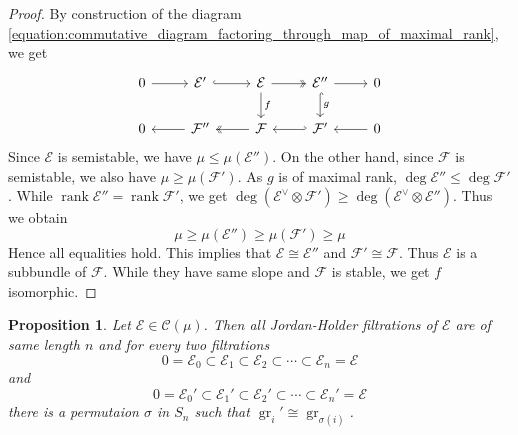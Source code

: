 \documentclass{ctexart}
\newtheorem{proposition}{Proposition}[section]
\newcommand{\rank}{\operatorname{rank}}
\newcommand{\grade}{\operatorname{gr}}
\begin{document}
\begin{proof}
    By construction of the diagram \ref{equation:commutative_diagram_factoring_through_map_of_maximal_rank}, we get
    \begin{equation}
        \begin{tikzcd}
            0 \arrow[r] &
            \mathcal{E}' \arrow[r, hookrightarrow] &
            \mathcal{E} \arrow[r, twoheadrightarrow] \arrow[d, "f"] &
            \mathcal{E}'' \arrow[r] \arrow[d, hookrightarrow, "g"] &
            0 \\
            0 &
            \mathcal{F}'' \arrow[l] &
            \mathcal{F} \arrow[r, hookleftarrow] \arrow[l, twoheadrightarrow] &
            \mathcal{F}' &
            0 \arrow[l] 
        \end{tikzcd}
    \end{equation}
    Since $\mathcal{E}$ is semistable, we have $\mu \le \mu(\mathcal{E}'')$.
    On the other hand, since $\mathcal{F}$ is semistable, we also have $\mu \ge \mu(\mathcal{F}')$.
    As $g$ is of maximal rank, $\deg \mathcal{E}'' \le \deg \mathcal{F}'$.
    While $\rank \mathcal{E}'' = \rank \mathcal{F}'$, we get $\deg (\mathcal{E}^{\vee} \otimes \mathcal{F}') \ge \deg (\mathcal{E}^{\vee} \otimes \mathcal{E}'')$.
    Thus we obtain
    \begin{equation}
        \mu \ge \mu(\mathcal{E}'') \ge \mu(\mathcal{F}') \ge \mu
    \end{equation}
    Hence all equalities hold.
    This implies that $\mathcal{E} \cong \mathcal{E}''$ and $\mathcal{F}' \cong \mathcal{F}$.
    Thus $\mathcal{E}$ is a subbundle of $\mathcal{F}$.
    While they have same slope and $\mathcal{F}$ is stable, we get $f$ isomorphic.
\end{proof}
\begin{proposition}
    Let $\mathcal{E}\in \mathscr{C}(\mu)$.
    Then all Jordan-Holder filtrations of $\mathcal{E}$ are of same length $n$ and for every two filtrations
    \begin{equation}
        0 = \mathcal{E}_{0} \subset \mathcal{E}_{1} \subset \mathcal{E}_{2} \subset \cdots \subset \mathcal{E}_{n} = \mathcal{E}
    \end{equation}
    and
    \begin{equation}
        0 = \mathcal{E}_{0}' \subset \mathcal{E}_{1}' \subset \mathcal{E}_{2}' \subset \cdots \subset \mathcal{E}_{n}' = \mathcal{E}
    \end{equation}
    there is a permutaion $\sigma$ in $S_{n}$ such that $\grade_{i}' \cong \grade_{\sigma(i)}$.
    \label{Proposition 7.9}
\end{proposition}
\end{document}
